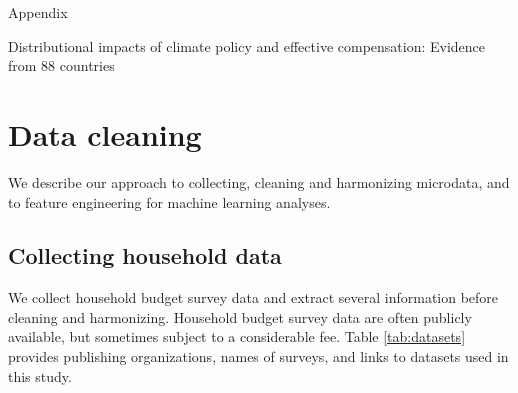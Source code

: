\documentclass[12pt, a4paper]{article}
\begin{document}
\appendix 
\begin{refsection}
{\Huge Appendix} \label{sec:appendix}

Distributional impacts of climate policy and effective compensation: Evidence from 88 countries

\clearpage
\section{Data cleaning} \label{sec:cleaning}

We describe our approach to collecting, cleaning and harmonizing microdata, and to feature engineering for machine learning analyses.

\subsection{Collecting household data}\label{sec:cleaning_1}

We collect household budget survey data and extract several information before cleaning and harmonizing. Household budget survey data are often publicly available, but sometimes subject to a considerable fee. Table \ref{tab:datasets} provides publishing organizations, names of surveys, and links to datasets used in this study.


\end{refsection}
\end{document}
